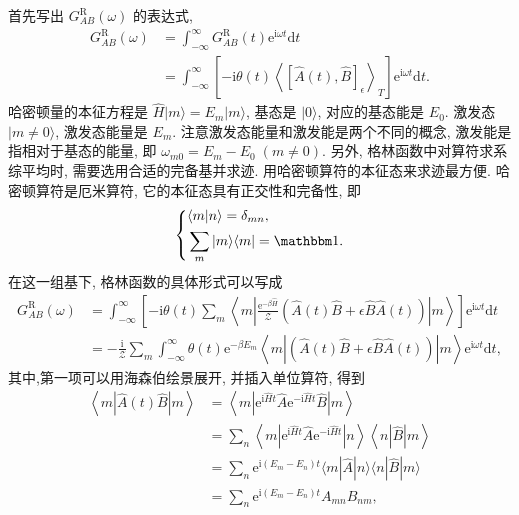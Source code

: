 首先写出 $G_{AB}^{\mathrm{R}}(\omega)$ 的表达式,
 \begin{align}
        G_{AB}^{\mathrm{R}}(\omega)&=\int_{-\infty}^\infty G_{AB}^{\mathrm{R}}(t)\mathrm{e}^{\mathrm{i}\omega t}\mathrm{d}t\nonumber\\
        &=\int_{-\infty}^\infty\left[ -\mathrm{i}\theta(t)\left\langle \left[ \hat A(t),\hat B \right]_\epsilon \right\rangle_T \right]\mathrm{e}^{\mathrm{i}\omega t}\mathrm{d}t.
    \end{align}
哈密顿量的本征方程是 $\hat H|m\rangle=E_m|m\rangle$, 基态是 $|0\rangle$, 对应的基态能是 $E_0$. 激发态 $|m\ne 0\rangle$, 激发态能量是 $E_m$. 注意激发态能量和激发能是两个不同的概念, 激发能是指相对于基态的能量, 即 $\omega_{m0}=E_m-E_0\;(m\ne 0)$. 
另外, 格林函数中对算符求系综平均时, 需要选用合适的完备基并求迹. 用哈密顿算符的本征态来求迹最方便. 哈密顿算符是厄米算符, 它的本征态具有正交性和完备性, 即
\begin{equation}
    \left\{ 
        \begin{aligned}
            &\langle m|n \rangle=\delta_{mn},\\
            &\sum_m|m\rangle\langle m|=\mathbbm 1.
        \end{aligned}
    \right.
\end{equation}
在这一组基下, 格林函数的具体形式可以写成
    \begin{align}
        G_{AB}^{\mathrm{R}}(\omega)&=\int_{-\infty}^\infty\left[ -\mathrm{i}\theta(t)\sum_m\left\langle m\left|\frac{\mathrm{e}^{-\beta\hat H}}{\mathcal{Z}}\left( \hat{A}(t)\hat{B}+\epsilon\hat{B}\hat{A}(t) \right)\right|m\right\rangle \right] \mathrm{e}^{\mathrm{i}\omega t}\mathrm{d}t\nonumber\\
        &=-\frac{\mathrm{i}}{\mathcal{Z}}\sum_m\int_{-\infty}^\infty \theta(t)\mathrm{e}^{-\beta E_m}\left\langle m\left| \left( \hat{A}(t)\hat{B}+\epsilon\hat{B}\hat{A}(t) \right) \right| m\right\rangle\mathrm{e}^{\mathrm{i}\omega t}\mathrm{d}t,
    \end{align}
其中,第一项可以用海森伯绘景展开, 并插入单位算符, 得到
    \begin{align}
        \left\langle m\left| \hat{A}(t)\hat{B} \right|m \right\rangle&=\left\langle m\left|\mathrm{e}^{\mathrm{i}\hat{H}t}\hat{A}\mathrm{e}^{-\mathrm{i}\hat{H}t}\hat{B} \right| m\right\rangle\nonumber\\
        &=\sum_n\left\langle m\left| \mathrm{e}^{\mathrm{i}\hat{H}t}\hat{A}\mathrm{e}^{-\mathrm{i}\hat{H}t} \right| n \right\rangle\left\langle n\left| \hat{B} \right|m \right\rangle\nonumber\\
        &=\sum_n \mathrm{e}^{\mathrm{i}(E_m-E_n)t}\langle m|\hat{A}|n \rangle\langle n|\hat{B}|m \rangle\nonumber\\
        &=\sum_n\mathrm{e}^{\mathrm{i}(E_m-E_n)t}A_{mn}B_{nm},
    \end{align}
